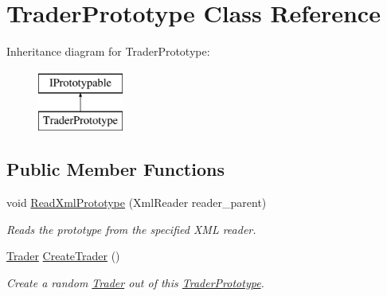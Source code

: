 \hypertarget{class_trader_prototype}{}\section{Trader\+Prototype Class Reference}
\label{class_trader_prototype}
Inheritance diagram for Trader\+Prototype\+:\begin{figure}[H]
\begin{center}
\leavevmode
\includegraphics[height=2.000000cm]{class_trader_prototype}
\end{center}
\end{figure}
\subsection*{Public Member Functions}
\begin{DoxyCompactItemize}
\item 
void \hyperlink{class_trader_prototype_a0b071be077414f02a1f78b3217743fe6}{Read\+Xml\+Prototype} (Xml\+Reader reader\+\_\+parent)
\begin{DoxyCompactList}\small\item\em Reads the prototype from the specified X\+ML reader. \end{DoxyCompactList}\item 
\hyperlink{class_trader}{Trader} \hyperlink{class_trader_prototype_a872ada8d81c0b2e7e1fc236447758e3a}{Create\+Trader} ()
\begin{DoxyCompactList}\small\item\em Create a random \hyperlink{class_trader}{Trader} out of this \hyperlink{class_trader_prototype}{Trader\+Prototype}. \end{DoxyCompactList}\end{DoxyCompactItemize}
